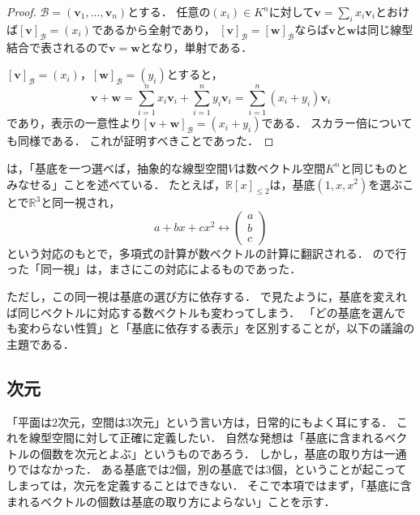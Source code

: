 \begin{tleftbar}
\begin{proof}
  $\mathcal{B} = (\bm{v}_1, \dots, \bm{v}_n)$とする．
  任意の$(x_i)\in K^n$に対して$\bm{v}=\sum_i x_i\bm{v}_i$とおけば$[\bm{v}]_{\mathcal{B}}=(x_i)$であるから全射であり，
  $[\bm{v}]_{\mathcal{B}}=[\bm{w}]_{\mathcal{B}}$ならば$\bm{v}$と$\bm{w}$は同じ線型結合で表されるので$\bm{v}=\bm{w}$となり，単射である．

  $[\bm{v}]_{\mathcal{B}} = (x_i)$，$[\bm{w}]_{\mathcal{B}} = (y_i)$とすると，
  \[
    \bm{v} + \bm{w}
    = \sum_{i=1}^{n} x_i \bm{v}_i + \sum_{i=1}^{n} y_i \bm{v}_i
    = \sum_{i=1}^{n} (x_i + y_i) \bm{v}_i
  \]
  であり，表示の一意性より$[\bm{v} + \bm{w}]_{\mathcal{B}} = (x_i + y_i)$である．
  スカラー倍についても同様である．
  これが証明すべきことであった．
\end{proof}
\end{tleftbar}

\begin{remark}
  は，「基底を一つ選べば，抽象的な線型空間$V$は数ベクトル空間$K^n$と同じものとみなせる」ことを述べている．
  たとえば，$\mathbb{R}[x]_{\le 2}$は，基底$(1, x, x^2)$を選ぶことで$\mathbb{R}^3$と同一視され，
  \[
    a + bx + cx^2 \longleftrightarrow \begin{pmatrix} a \\ b \\ c \end{pmatrix}
  \]
  という対応のもとで，多項式の計算が数ベクトルの計算に翻訳される．
  ので行った「同一視」は，まさにこの対応によるものであった．

  ただし，この同一視は基底の選び方に依存する．
  で見たように，基底を変えれば同じベクトルに対応する数ベクトルも変わってしまう．
  「どの基底を選んでも変わらない性質」と「基底に依存する表示」を区別することが，以下の議論の主題である．
\end{remark}

\subsection{次元}

「平面は$2$次元，空間は$3$次元」という言い方は，日常的にもよく耳にする．
これを線型空間に対して正確に定義したい．
自然な発想は「基底に含まれるベクトルの個数を次元とよぶ」というものであろう．
しかし，基底の取り方は一通りではなかった．
ある基底では$2$個，別の基底では$3$個，ということが起こってしまっては，次元を定義することはできない．
そこで本項ではまず，「基底に含まれるベクトルの個数は基底の取り方によらない」ことを示す．

